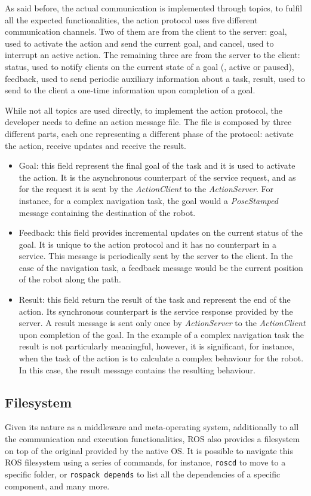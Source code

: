 As said before, the actual communication is implemented through topics, to fulfil all the expected functionalities, the action protocol uses five different communication channels. Two of them are from the client to the server: goal, used to activate the action and send the current goal, and cancel, used to interrupt an active action. The remaining three are from the server to the client: status, used to notify clients on the current state of a goal (\eg, active or paused), feedback, used to send periodic auxiliary information about a task, result, used to send to the client a one-time information upon completion of a goal.

While not all topics are used directly, to implement the action protocol, the developer needs to define an action message file. The file is composed by three different parts, each one representing a different phase of the protocol: activate the action, receive updates and receive the result. 
\begin{itemize}
\item Goal: this field represent the final goal of the task and it is used to activate the action. It is the asynchronous counterpart of the service request, and as for the request it is sent by the \textit{ActionClient} to the \textit{ActionServer}. For instance, for a complex navigation task, the goal would a \textit{PoseStamped} message containing the destination of the robot.
\item Feedback: this field provides incremental updates on the current status of the goal. It is unique to the action protocol and it has no counterpart in a service. This message is periodically sent by the server to the client. In the case of the navigation task, a feedback message would be the current position of the robot along the path.
\item Result: this field return the result of the task and represent the end of the action. Its synchronous counterpart is the service response provided by the server. A result message is sent only once by \textit{ActionServer} to the \textit{ActionClient} upon completion of the goal. In the example of a complex navigation task the result is not particularly meaningful, however, it is significant, for instance, when the task of the action is to calculate a complex behaviour for the robot. In this case, the result message contains the resulting behaviour.
\end{itemize}

\subsection{Filesystem}
Given its nature as a middleware and meta-operating system, additionally to all the communication and execution functionalities, ROS also provides a filesystem on top of the original provided by the native OS. It is possible to navigate this ROS filesystem using a series of commands, for instance, \texttt{roscd} to move to a specific folder, or \texttt{rospack depends} to list all the dependencies of a specific component, and many more.

